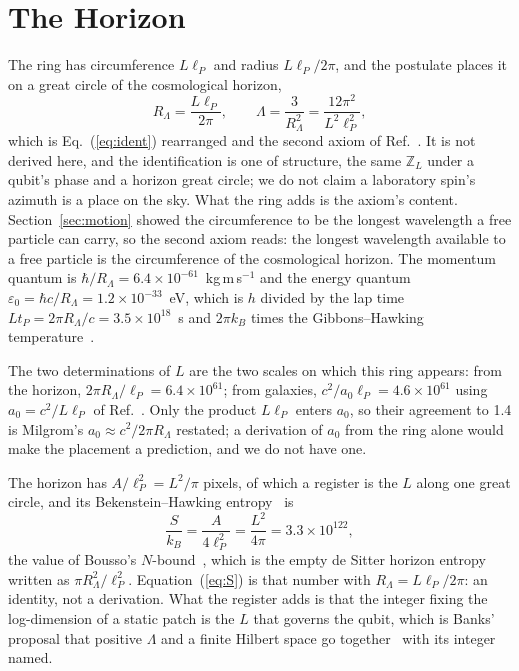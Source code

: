 \documentclass[aps,prd,twocolumn,superscriptaddress,nofootinbib]{revtex4-2}
\begin{document}
\section{The Horizon}
\label{sec:horizon}

The ring has circumference $L\ell_P$ and radius $L\ell_P/2\pi$, and the postulate places it on a great circle of the cosmological horizon,
\begin{equation}
R_\Lambda = \frac{L\ell_P}{2\pi}, \qquad \Lambda = \frac{3}{R_\Lambda^2} = \frac{12\pi^2}{L^2\ell_P^2},
\label{eq:closure}
\end{equation}
which is Eq.~(\ref{eq:ident}) rearranged and the second axiom of Ref.~\cite{korytko2026}. It is not derived here, and the identification is one of structure, the same $\mathbb{Z}_L$ under a qubit's phase and a horizon great circle; we do not claim a laboratory spin's azimuth is a place on the sky. What the ring adds is the axiom's content. Section~\ref{sec:motion} showed the circumference to be the longest wavelength a free particle can carry, so the second axiom reads: the longest wavelength available to a free particle is the circumference of the cosmological horizon. The momentum quantum is $\hbar/R_\Lambda = 6.4\times10^{-61}$~kg\,m\,s$^{-1}$ and the energy quantum $\varepsilon_0 = \hbar c/R_\Lambda = 1.2\times10^{-33}$~eV, which is $h$ divided by the lap time $Lt_P = 2\pi R_\Lambda/c = 3.5\times10^{18}$~s and $2\pi k_B$ times the Gibbons--Hawking temperature~\cite{gibbons1977}.

The two determinations of $L$ are the two scales on which this ring appears: from the horizon, $2\pi R_\Lambda/\ell_P = 6.4\times10^{61}$; from galaxies, $c^2/a_0\ell_P = 4.6\times10^{61}$ using $a_0 = c^2/L\ell_P$ of Ref.~\cite{korytko2026}. Only the product $L\ell_P$ enters $a_0$, so their agreement to 1.4 is Milgrom's $a_0 \approx c^2/2\pi R_\Lambda$ restated; a derivation of $a_0$ from the ring alone would make the placement a prediction, and we do not have one.

The horizon has $A/\ell_P^2 = L^2/\pi$ pixels, of which a register is the $L$ along one great circle, and its Bekenstein--Hawking entropy~\cite{bekenstein1973} is
\begin{equation}
\frac{S}{k_B} = \frac{A}{4\ell_P^2} = \frac{L^2}{4\pi} = 3.3\times10^{122},
\label{eq:S}
\end{equation}
the value of Bousso's $N$-bound~\cite{bousso2000,bousso1999b}, which is the empty de Sitter horizon entropy written as $\pi R_\Lambda^2/\ell_P^2$. Equation~(\ref{eq:S}) is that number with $R_\Lambda = L\ell_P/2\pi$: an identity, not a derivation. What the register adds is that the integer fixing the log-dimension of a static patch is the $L$ that governs the qubit, which is Banks' proposal that positive $\Lambda$ and a finite Hilbert space go together~\cite{banks2000} with its integer named.
\end{document}
